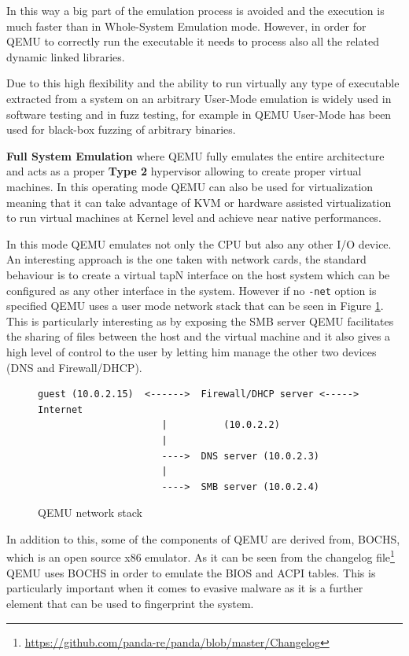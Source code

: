 In this way a big part of the emulation process is avoided and the execution is much faster than in Whole-System Emulation mode. However, in order for QEMU to correctly run the executable it needs to process also all the related dynamic linked libraries. 

Due to this high flexibility and the ability to run virtually any type of executable extracted from a system on an arbitrary User-Mode emulation is widely used in software testing and in fuzz testing, for example in \cite{QASan-SecDev20} QEMU User-Mode has been used for black-box fuzzing of arbitrary binaries.

\textbf{Full System Emulation} where QEMU fully emulates the entire architecture and acts as a proper \textbf{Type 2} hypervisor allowing to create proper virtual machines. In this operating mode QEMU can also be used for virtualization meaning that it can take advantage of KVM or hardware assisted virtualization to run virtual machines at Kernel level and achieve near native performances. 

In this mode QEMU emulates not only the CPU but also any other I/O device. An interesting approach is the one taken with network cards, the standard behaviour is to create a virtual tapN interface on the host system which can be configured as any other interface in the system. However if no \lstinline{-net} option is specified QEMU uses a user mode network stack that can be seen in Figure \ref{fig:qemunet}. This is particularly interesting as by exposing the SMB server QEMU facilitates the sharing of files between the host and the virtual machine and it also gives a high level of control to the user by letting him manage the other two devices (DNS and Firewall/DHCP).

\begin{figure}[htp]
\centering
\begin{lstlisting}
guest (10.0.2.15)  <------>  Firewall/DHCP server <-----> Internet
                      |          (10.0.2.2)
                      |
                      ---->  DNS server (10.0.2.3)
                      |
                      ---->  SMB server (10.0.2.4)
\end{lstlisting}
\caption{QEMU network stack}
\label{fig:qemunet}
\end{figure}

In addition to this, some of the components of QEMU are derived from, BOCHS, which is an open source x86 emulator. As it can be seen from the changelog file\footnote{\url{https://github.com/panda-re/panda/blob/master/Changelog}} QEMU uses BOCHS in order to emulate the BIOS and ACPI tables. This is particularly important when it comes to evasive malware as it is a further element that can be used to fingerprint the system.

